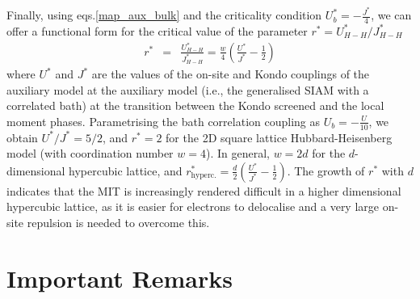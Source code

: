 \documentclass[10pt]{report}
\numberwithin{equation}{section}
\begin{document}
\begin{itemize}
Finally, using eqs.\eqref{map_aux_bulk} and the criticality condition $U_{b}^{*}=-\frac{J^{*}}{4}$, we can offer a functional form for the critical value of the parameter $r^{*} = U_{H-H}^{*}/J_{H-H}^{*}$
\begin{eqnarray}
r^{*} &=& \frac{U_{H-H}^{*}}{J_{H-H}^{*}} = \frac{w}{4}\left(\frac{U^{*}}{J^{*}} - \frac{1}{2}\right)
\end{eqnarray}
where $U^{*}$ and $J^{*}$ are the values of the on-site and Kondo couplings of the auxiliary model at the auxiliary model (i.e., the generalised SIAM with a correlated bath) at the transition between the Kondo screened and the local moment phases. Parametrising the bath correlation coupling as $U_{b}=-\frac{U}{10}$, we obtain $U^{*}/J^{*}=5/2$, and $r^{*} = 2$ for the 2D square lattice Hubbard-Heisenberg model (with coordination number $w=4$). In general, $w=2d$ for the $d$-dimensional hypercubic lattice, and 
$r^{*}_\text{hyperc.} = \frac{d}{2}\left(\frac{U^{*}}{J^{*}} - \frac{1}{2}\right)$. The growth of $r^{*}$ with $d$ indicates that the MIT is increasingly rendered difficult in a higher dimensional hypercubic lattice, as it is easier for electrons to delocalise and a very large on-site repulsion is needed to overcome this.
\end{itemize}

\section{Important Remarks}
\end{document}
